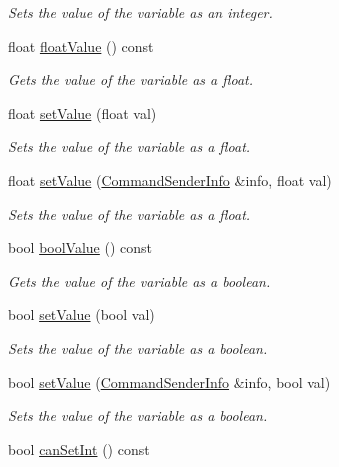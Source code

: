 \begin{DoxyCompactItemize}
\begin{DoxyCompactList}\small\item\em Sets the value of the variable as an integer. \end{DoxyCompactList}\item 
float \hyperlink{class_con_var_a03abad95ed4b10c3a4e9335f3b1907e5}{float\-Value} () const 
\begin{DoxyCompactList}\small\item\em Gets the value of the variable as a float. \end{DoxyCompactList}\item 
float \hyperlink{class_con_var_ab34af2465c1dc9759ed2f469a89f9f93}{set\-Value} (float val)
\begin{DoxyCompactList}\small\item\em Sets the value of the variable as a float. \end{DoxyCompactList}\item 
float \hyperlink{class_con_var_ad3adc3f712e2594d33ad34dfe785d387}{set\-Value} (\hyperlink{class_command_sender_info}{Command\-Sender\-Info} \&info, float val)
\begin{DoxyCompactList}\small\item\em Sets the value of the variable as a float. \end{DoxyCompactList}\item 
bool \hyperlink{class_con_var_a191b4d80fbe76e8e1a03fd660236fd24}{bool\-Value} () const 
\begin{DoxyCompactList}\small\item\em Gets the value of the variable as a boolean. \end{DoxyCompactList}\item 
bool \hyperlink{class_con_var_a8dfb9d5c094bb4815a58fc23aa44f869}{set\-Value} (bool val)
\begin{DoxyCompactList}\small\item\em Sets the value of the variable as a boolean. \end{DoxyCompactList}\item 
bool \hyperlink{class_con_var_a186fc5371b3a22dd905975b88bdc3edb}{set\-Value} (\hyperlink{class_command_sender_info}{Command\-Sender\-Info} \&info, bool val)
\begin{DoxyCompactList}\small\item\em Sets the value of the variable as a boolean. \end{DoxyCompactList}\item 
bool \hyperlink{class_con_var_af13ded23be8ab55c52e39b679b9bda8b}{can\-Set\-Int} () const 

\end{DoxyCompactItemize}
